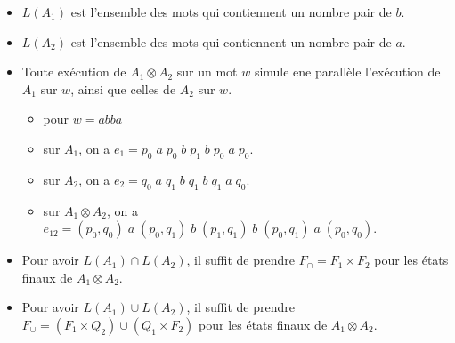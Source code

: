 \begin{example}
\begin{figure}[H]
    \end{figure}
    \begin{itemize}[label=\textbullet]
        \item $L(A_1)$ est l'ensemble des mots qui contiennent un nombre pair de $b$.
        \item $L(A_2)$ est l'ensemble des mots qui contiennent un nombre pair de $a$.
        \item Toute exécution de $A_1\otimes A_2$ sur un mot $w$ simule ene parallèle l'exécution de $A_1$ sur $w$, ainsi
        que celles de $A_2$ sur $w$.
            \begin{itemize}
                \item pour $w=abba$
                \item sur $A_1$, on a $e_1 = p_0\; a\; p_0\; b\; p_1\; b\; p_0\; a\; p_0$.
                \item sur $A_2$, on a $e_2 = q_0\; a\; q_1\; b\; q_1\; b\; q_1\; a\; q_0$.
                \item sur $A_1\otimes A_2$, on a $e_{12} = (p_0, q_0)\; a\; (p_0, q_1)\; b\; (p_1, q_1)\; b\; (p_0, q_1)\; 
                a\; (p_0, q_0)$.
            \end{itemize}
        \item Pour avoir $L(A_1) \cap L(A_2)$, il suffit de prendre $F_{\cap} = F_1 \times F_2$ pour les états finaux de 
        $A_1\otimes A_2$.
        \item Pour avoir $L(A_1) \cup L(A_2)$, il suffit de prendre $F_{\cup} = (F_1 \times Q_2) \cup (Q_1 \times F_2)$ pour
        les états finaux de $A_1\otimes A_2$.
    \end{itemize}
\end{example}
